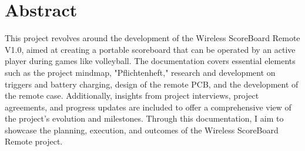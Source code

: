 \chapter*{Abstract}
\label{cha:Abstract}

This project revolves around the development of the Wireless ScoreBoard Remote V1.0, aimed at creating a portable scoreboard that can be operated by an active player during games like volleyball. The documentation covers essential elements such as the project mindmap, "Pflichtenheft," research and development on triggers and battery charging, design of the remote PCB, and the development of the remote case. Additionally, insights from project interviews, project agreements, and progress updates are included to offer a comprehensive view of the project's evolution and milestones. Through this documentation, I aim to showcase the planning, execution, and outcomes of the Wireless ScoreBoard Remote project.